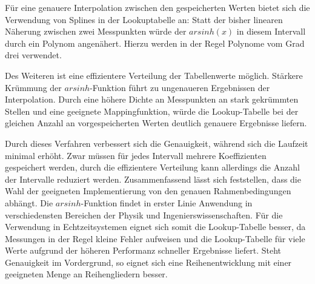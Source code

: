 \documentclass[course=erap] {aspdoc}
\begin{document}
    Für eine genauere Interpolation zwischen den gespeicherten Werten bietet sich die Verwendung von Splines in der Lookuptabelle an:
    Statt der bisher linearen Näherung zwischen zwei Messpunkten würde der $arsinh(x)$ in diesem Intervall durch ein Polynom angenähert.
    Hierzu werden in der Regel Polynome vom Grad drei verwendet.~\cite{splines}

    Des Weiteren ist eine effizientere Verteilung der Tabellenwerte möglich.
    Stärkere Krümmung der $arsinh$-Funktion führt zu ungenaueren Ergebnissen der Interpolation.
    Durch eine höhere Dichte an Messpunkten an stark gekrümmten Stellen und eine geeignete Mappingfunktion, würde die Lookup-Tabelle bei der gleichen Anzahl an vorgespeicherten Werten deutlich genauere Ergebnisse liefern.

    Durch dieses Verfahren verbessert sich die Genauigkeit, während sich die Laufzeit minimal erhöht.
    Zwar müssen für jedes Intervall mehrere Koeffizienten gespeichert werden, durch die effizientere Verteilung kann allerdings die Anzahl der Intervalle reduziert werden. 
    \newline
    \newline
    Zusammenfassend lässt sich feststellen, dass die Wahl der geeigneten Implementierung von den genauen Rahmenbedingungen abhängt.
    Die $arsinh$-Funktion findet in erster Linie Anwendung in verschiedensten Bereichen der Physik und Ingenierswissenschaften.
    Für die Verwendung in Echtzeitsystemen eignet sich somit die Lookup-Tabelle besser, da Messungen in der Regel kleine Fehler aufweisen und die Lookup-Tabelle für viele Werte aufgrund der höheren Performanz schneller Ergebnisse liefert.
    Steht Genauigkeit im Vordergrund, so eignet sich eine Reihenentwicklung mit einer geeigneten Menge an Reihengliedern besser.

    
    
\end{document}
